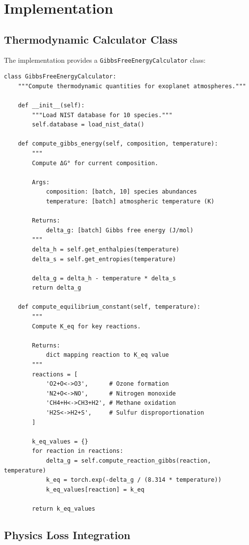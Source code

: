 \documentclass[12pt,a4paper,oneside]{report}
\begin{document}
\section{Implementation}

\subsection{Thermodynamic Calculator Class}

The implementation provides a \texttt{GibbsFreeEnergyCalculator} class:

\begin{lstlisting}
class GibbsFreeEnergyCalculator:
    """Compute thermodynamic quantities for exoplanet atmospheres."""

    def __init__(self):
        """Load NIST database for 10 species."""
        self.database = load_nist_data()

    def compute_gibbs_energy(self, composition, temperature):
        """
        Compute ΔG° for current composition.

        Args:
            composition: [batch, 10] species abundances
            temperature: [batch] atmospheric temperature (K)

        Returns:
            delta_g: [batch] Gibbs free energy (J/mol)
        """
        delta_h = self.get_enthalpies(temperature)
        delta_s = self.get_entropies(temperature)

        delta_g = delta_h - temperature * delta_s
        return delta_g

    def compute_equilibrium_constant(self, temperature):
        """
        Compute K_eq for key reactions.

        Returns:
            dict mapping reaction to K_eq value
        """
        reactions = [
            'O2+O<->O3',      # Ozone formation
            'N2+O<->NO',      # Nitrogen monoxide
            'CH4+H<->CH3+H2', # Methane oxidation
            'H2S<->H2+S',     # Sulfur disproportionation
        ]

        k_eq_values = {}
        for reaction in reactions:
            delta_g = self.compute_reaction_gibbs(reaction, temperature)
            k_eq = torch.exp(-delta_g / (8.314 * temperature))
            k_eq_values[reaction] = k_eq

        return k_eq_values
\end{lstlisting}

\subsection{Physics Loss Integration}
\end{document}
